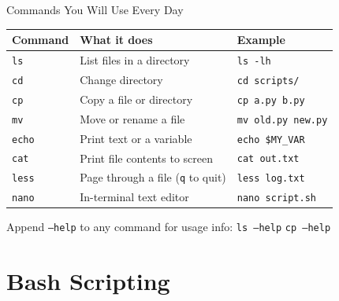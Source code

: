 \documentclass[aspectratio=169, 11pt]{beamer}
\begin{document}
\begin{frame}{Commands You Will Use Every Day}
  \begin{table}
    \centering
    \scriptsize
    \renewcommand{\arraystretch}{1.15}
    \begin{tabular}{lll}
      \toprule
      \textbf{Command} & \textbf{What it does} & \textbf{Example} \\
      \midrule
      \texttt{ls}   & List files in a directory          & \texttt{ls -lh} \\
      \texttt{cd}   & Change directory                   & \texttt{cd scripts/} \\
      \texttt{cp}   & Copy a file or directory           & \texttt{cp a.py b.py} \\
      \texttt{mv}   & Move or rename a file              & \texttt{mv old.py new.py} \\
      \texttt{echo} & Print text or a variable           & \texttt{echo \$MY\_VAR} \\
      \texttt{cat}  & Print file contents to screen      & \texttt{cat out.txt} \\
      \texttt{less} & Page through a file (\texttt{q} to quit) & \texttt{less log.txt} \\
      \texttt{nano} & In-terminal text editor            & \texttt{nano script.sh} \\
      \bottomrule
    \end{tabular}
  \end{table}
  \vspace{0.3em}
  {\scriptsize Append \texttt{--help} to any command for usage info: \quad \texttt{ls --help} \quad \texttt{cp --help}}
\end{frame}


\section{Bash Scripting}
\end{document}
